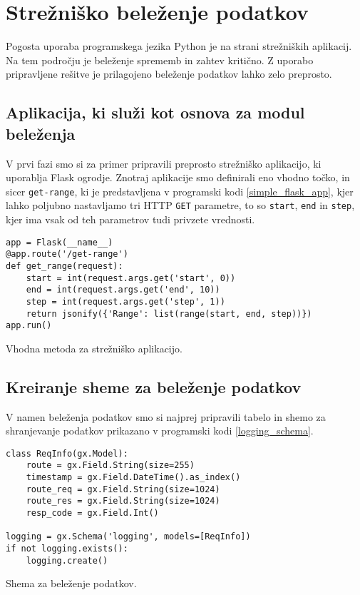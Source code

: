 \documentclass[a4paper,12pt,openright]{book}
\begin{document}
    \section{Strežniško beleženje podatkov}

    Pogosta uporaba programskega jezika Python je na strani strežniških aplikacij. Na tem področju je beleženje sprememb in zahtev kritično. Z uporabo pripravljene rešitve je prilagojeno beleženje podatkov lahko zelo preprosto.

    \subsection{Aplikacija, ki služi kot osnova za modul beleženja}

    V prvi fazi smo si za primer pripravili preprosto strežniško aplikacijo, ki uporablja Flask \cite{FLASK_GITHUB} ogrodje. Znotraj aplikacije smo definirali eno vhodno točko, in sicer {\tt get-range}, ki je predstavljena v programski kodi \ref{simple_flask_app}, kjer lahko poljubno nastavljamo tri HTTP {\tt GET} parametre, to so {\tt start}, {\tt end} in {\tt step}, kjer ima vsak od teh parametrov tudi privzete vrednosti.

\begin{code}
\begin{verbatim}
app = Flask(__name__)
@app.route('/get-range')
def get_range(request):
    start = int(request.args.get('start', 0))
    end = int(request.args.get('end', 10))
    step = int(request.args.get('step', 1))
    return jsonify({'Range': list(range(start, end, step))})
app.run()
\end{verbatim}
\caption{Vhodna metoda za strežniško aplikacijo.}
\label{simple_flask_app}
\end{code}

    \subsection{Kreiranje sheme za beleženje podatkov}

    V namen beleženja podatkov smo si najprej pripravili tabelo in shemo za shranjevanje podatkov prikazano v programski kodi \ref{logging_schema}.

\begin{code}
\begin{verbatim}
class ReqInfo(gx.Model):
    route = gx.Field.String(size=255)
    timestamp = gx.Field.DateTime().as_index()
    route_req = gx.Field.String(size=1024)
    route_res = gx.Field.String(size=1024)
    resp_code = gx.Field.Int()

logging = gx.Schema('logging', models=[ReqInfo])
if not logging.exists():
    logging.create()
\end{verbatim}
\caption{Shema za beleženje podatkov.}
\label{logging_schema}
\end{code}
\end{document}
